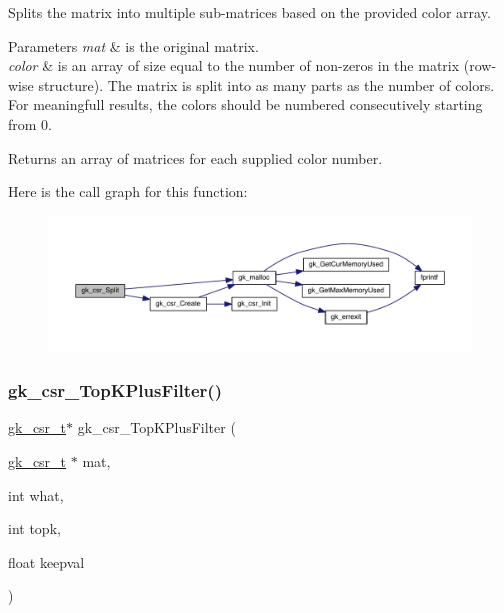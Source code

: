 Splits the matrix into multiple sub-\/matrices based on the provided color array. 
\begin{DoxyParams}{Parameters}
{\em mat} & is the original matrix. \\
\hline
{\em color} & is an array of size equal to the number of non-\/zeros in the matrix (row-\/wise structure). The matrix is split into as many parts as the number of colors. For meaningfull results, the colors should be numbered consecutively starting from 0. \\
\hline
\end{DoxyParams}
\begin{DoxyReturn}{Returns}
an array of matrices for each supplied color number. 
\end{DoxyReturn}
Here is the call graph for this function\+:\nopagebreak
\begin{figure}[H]
\begin{center}
\leavevmode
\includegraphics[width=350pt]{a00077_ac438fca404c3f1ff6989aa68f83ed241_cgraph}
\end{center}
\end{figure}
\mbox{\label{a00077_ad6f2c5699b47e1bc2285a1b391d7c7da}} 
\subsubsection{\texorpdfstring{gk\+\_\+csr\+\_\+\+Top\+K\+Plus\+Filter()}{gk\_csr\_TopKPlusFilter()}}
{\footnotesize\ttfamily \hyperlink{a00634}{gk\+\_\+csr\+\_\+t}$\ast$ gk\+\_\+csr\+\_\+\+Top\+K\+Plus\+Filter (\begin{DoxyParamCaption}\item[{\hyperlink{a00634}{gk\+\_\+csr\+\_\+t} $\ast$}]{mat,  }\item[{int}]{what,  }\item[{int}]{topk,  }\item[{float}]{keepval }\end{DoxyParamCaption})}

